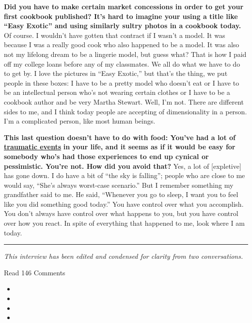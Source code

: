 \textbf{Did you have to make certain market concessions in order to get
your first cookbook published? It's hard to imagine your using a title
like ``Easy Exotic'' and using similarly sultry photos in a cookbook
today.} Of course. I wouldn't have gotten that contract if I wasn't a
model. It was because I was a really good cook who also happened to be a
model. It was also not my lifelong dream to be a lingerie model, but
guess what? That is how I paid off my college loans before any of my
classmates. We all do what we have to do to get by. I love the pictures
in ``Easy Exotic,'' but that's the thing, we put people in these boxes:
I have to be a pretty model who doesn't eat or I have to be an
intellectual person who's not wearing certain clothes or I have to be a
cookbook author and be very Martha Stewart. Well, I'm not. There are
different sides to me, and I think today people are accepting of
dimensionality in a person. I'm a complicated person, like most human
beings.

\textbf{This last question doesn't have to do with food: You've had a
lot of}
\textbf{\href{http://nytimes3xbfgragh.onion\#tooltip-12}{traumatic
events}} \textbf{in your life, and it seems as if it would be easy for
somebody who's had those experiences to end up cynical or pessimistic.
You're not. How did you avoid that?} Yes, a lot of {[}expletive{]} has
gone down. I do have a bit of ``the sky is falling''; people who are
close to me would say, ``She's always worst-case scenario.'' But I
remember something my grandfather said to me. He said, ``Whenever you go
to sleep, I want you to feel like you did something good today.'' You
have control over what you accomplish. You don't always have control
over what happens to you, but you have control over how you react. In
spite of everything that happened to me, look where I am today.

\begin{center}\rule{0.5\linewidth}{\linethickness}\end{center}

\emph{This interview has been edited and condensed for clarity from two
conversations.}

Read 146 Comments

\begin{itemize}
\item
\item
\item
\item
\end{itemize}

